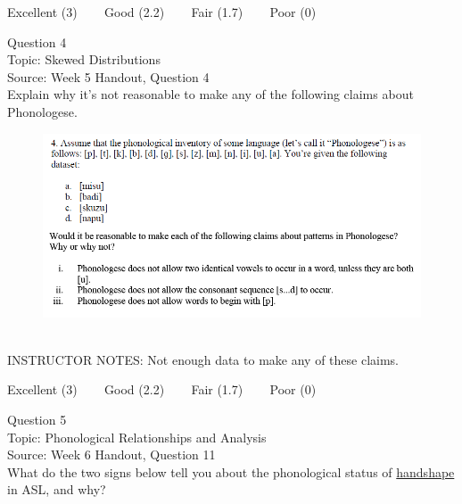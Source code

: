 \documentclass[12pt]{article}
\begin{document}
\vfill
Excellent (3) ~~~ Good (2.2) ~~~ Fair (1.7) ~~~ Poor (0)
\newpage

{\large Question 4}\\

Topic: Skewed Distributions\\
Source: Week 5 Handout, Question 4\\

Explain why it's not reasonable to make any of the following claims about Phonologese.\\

\begin{figure}[H]
\includegraphics{../images/Phonologese.png}
\end{figure}

~\\
INSTRUCTOR NOTES: Not enough data to make any of these claims.


\vfill
Excellent (3) ~~~ Good (2.2) ~~~ Fair (1.7) ~~~ Poor (0)
\newpage

{\large Question 5}\\

Topic: Phonological Relationships and Analysis\\
Source: Week 6 Handout, Question 11\\

What do the two signs below tell you about the phonological status of \underline{handshape} in ASL, and why?\\
\end{document}
